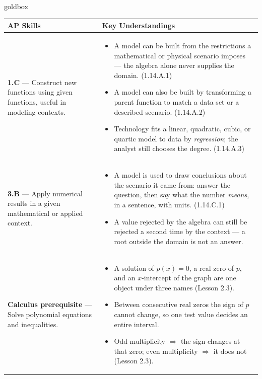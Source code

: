 \documentclass[10pt]{article}
\begin{document}
\renewcommand{\arraystretch}{1.6}
\begin{skillbox}{goldbox}
\begin{tabularx}{\linewidth}{@{}X X@{}}
\textbf{AP Skills} &
\textbf{Key Understandings} \\
\midrule
\textbf{1.C} --- Construct new functions using given functions, useful in
modeling contexts. &
\begin{itemize}[leftmargin=1.2em,itemsep=2pt,topsep=0pt]
  \item A model can be built from the restrictions a mathematical or physical
        scenario imposes --- the algebra alone never supplies the domain.
        (1.14.A.1)
  \item A model can also be built by transforming a parent function to match a
        data set or a described scenario. (1.14.A.2)
  \item Technology fits a linear, quadratic, cubic, or quartic model to data by
        \textit{regression}; the analyst still chooses the degree. (1.14.A.3)
\end{itemize} \\
\textbf{3.B} --- Apply numerical results in a given mathematical or applied
context. &
\begin{itemize}[leftmargin=1.2em,itemsep=2pt,topsep=0pt]
  \item A model is used to draw conclusions about the scenario it came from:
        answer the question, then say what the number \textit{means}, in a
        sentence, with units. (1.14.C.1)
  \item A value rejected by the algebra can still be rejected a second time by
        the context --- a root outside the domain is not an answer.
\end{itemize} \\
\textbf{Calculus prerequisite} --- Solve polynomial equations and inequalities.
&
\begin{itemize}[leftmargin=1.2em,itemsep=2pt,topsep=0pt]
  \item A solution of $p(x) = 0$, a real zero of $p$, and an $x$-intercept of
        the graph are one object under three names (Lesson 2.3).
  \item Between consecutive real zeros the sign of $p$ cannot change, so one
        test value decides an entire interval.
  \item Odd multiplicity $\Rightarrow$ the sign changes at that zero; even
        multiplicity $\Rightarrow$ it does not (Lesson 2.3).
\end{itemize} \\
\end{tabularx}
\end{skillbox}
\end{document}
